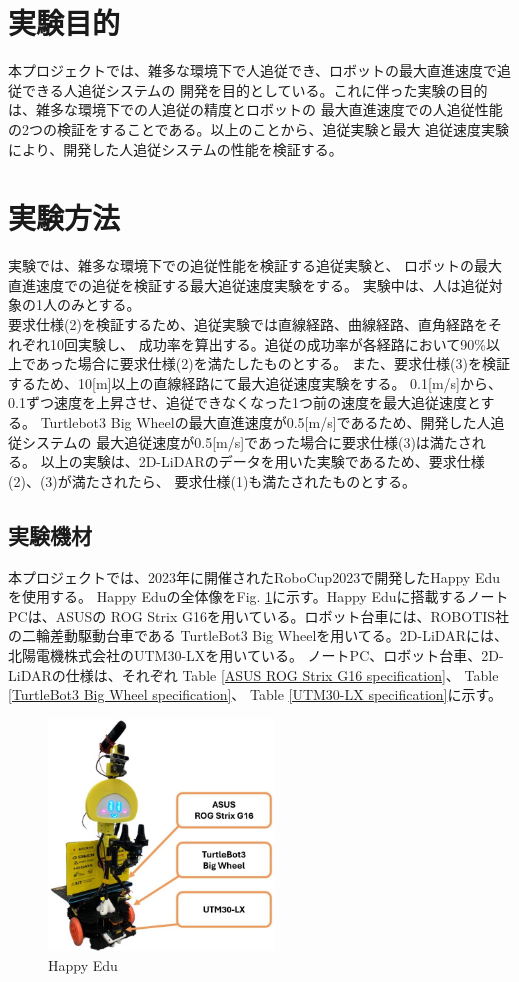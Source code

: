 \section{実験目的}
本プロジェクトでは、雑多な環境下で人追従でき、ロボットの最大直進速度で追従できる人追従システムの
開発を目的としている。これに伴った実験の目的は、雑多な環境下での人追従の精度とロボットの
最大直進速度での人追従性能の2つの検証をすることである。以上のことから、追従実験と最大
追従速度実験により、開発した人追従システムの性能を検証する。

\section{実験方法}
実験では、雑多な環境下での追従性能を検証する追従実験と、
ロボットの最大直進速度での追従を検証する最大追従速度実験をする。
実験中は、人は追従対象の1人のみとする。\\ \indent
要求仕様(2)を検証するため、追従実験では直線経路、曲線経路、直角経路をそれぞれ10回実験し、
成功率を算出する。追従の成功率が各経路において90\%以上であった場合に要求仕様(2)を満たしたものとする。
また、要求仕様(3)を検証するため、10[m]以上の直線経路にて最大追従速度実験をする。
0.1[m/s]から、0.1ずつ速度を上昇させ、追従できなくなった1つ前の速度を最大追従速度とする。
Turtlebot3 Big Wheelの最大直進速度が0.5[m/s]であるため、開発した人追従システムの
最大追従速度が0.5[m/s]であった場合に要求仕様(3)は満たされる。
以上の実験は、2D-LiDARのデータを用いた実験であるため、要求仕様(2)、(3)が満たされたら、
要求仕様(1)も満たされたものとする。

\subsection{実験機材}
本プロジェクトでは、2023年に開催されたRoboCup2023で開発したHappy Eduを使用する。
Happy Eduの全体像をFig. \ref{Happy Edu}に示す。Happy Eduに搭載するノートPCは、ASUSの
ROG Strix G16を用いている。ロボット台車には、ROBOTIS社の二輪差動駆動台車である
TurtleBot3 Big Wheelを用いてる。2D-LiDARには、北陽電機株式会社のUTM30-LXを用いている。
ノートPC、ロボット台車、2D-LiDARの仕様は、それぞれ
Table \ref{ASUS ROG Strix G16 specification}、
Table \ref{TurtleBot3 Big Wheel specification}、
Table \ref{UTM30-LX specification}に示す。

\begin{figure}[h]
  \begin{center}
  \includegraphics[width=60mm,clip]{figure/Happy_Edu.jpg}
  \caption{Happy Edu}
  \label{Happy Edu}
  \end{center}
\end{figure}

